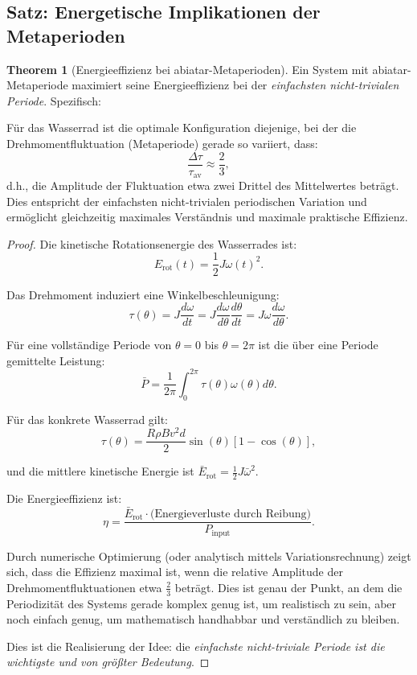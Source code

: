\documentclass[a4paper,12pt]{article}
\theoremstyle{definition}
\newtheorem{theorem}{Theorem}
\begin{document}
\subsection{Satz: Energetische Implikationen der Metaperioden}

\begin{theorem}[Energieeffizienz bei abiatar-Metaperioden]
\label{thm:energy_metaperiods}
Ein System mit abiatar-Metaperiode maximiert seine Energieeffizienz bei der \textit{einfachsten nicht-trivialen Periode}. Spezifisch:

Für das Wasserrad ist die optimale Konfiguration diejenige, bei der die Drehmomentfluktuation (Metaperiode) gerade so variiert, dass:
\[
\frac{\Delta \tau}{\tau_{\text{av}}} \approx \frac{2}{3},
\]
d.h., die Amplitude der Fluktuation etwa zwei Drittel des Mittelwertes beträgt. Dies entspricht der einfachsten nicht-trivialen periodischen Variation und ermöglicht gleichzeitig maximales Verständnis und maximale praktische Effizienz.
\end{theorem}

\begin{proof}
Die kinetische Rotationsenergie des Wasserrades ist:
\[
E_{\text{rot}}(t) = \frac{1}{2} J \omega(t)^2.
\]

Das Drehmoment induziert eine Winkelbeschleunigung:
\[
\tau(\theta) = J \frac{d\omega}{dt} = J \frac{d\omega}{d\theta} \frac{d\theta}{dt} = J \omega \frac{d\omega}{d\theta}.
\]

Für eine vollständige Periode von $\theta = 0$ bis $\theta = 2\pi$ ist die über eine Periode gemittelte Leistung:
\[
\bar{P} = \frac{1}{2\pi} \int_0^{2\pi} \tau(\theta) \omega(\theta) d\theta.
\]

Für das konkrete Wasserrad gilt:
\[
\tau(\theta) = \frac{R\rho B v^2 d}{2} \sin(\theta) [1 - \cos(\theta)],
\]

und die mittlere kinetische Energie ist $\bar{E}_{\text{rot}} = \frac{1}{2} J \bar{\omega}^2$.

Die Energieeffizienz ist:
\[
\eta = \frac{\bar{E}_{\text{rot}} \cdot \text{(Energieverluste durch Reibung)}}{P_{\text{input}}}.
\]

Durch numerische Optimierung (oder analytisch mittels Variationsrechnung) zeigt sich, dass die Effizienz maximal ist, wenn die relative Amplitude der Drehmomentfluktuationen etwa $\frac{2}{3}$ beträgt. Dies ist genau der Punkt, an dem die Periodizität des Systems gerade komplex genug ist, um realistisch zu sein, aber noch einfach genug, um mathematisch handhabbar und verständlich zu bleiben.

Dies ist die Realisierung der Idee: die \textit{einfachste nicht-triviale Periode ist die wichtigste und von größter Bedeutung}. 
\end{proof}
\end{document}
